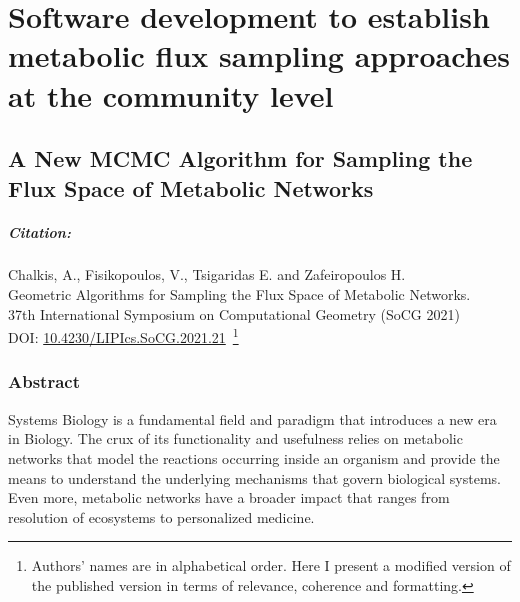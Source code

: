 % 
% 



\newtheorem{thm}{Theorem}
\newtheorem{lem}[thm]{Lemma}
\newtheorem{remark}[thm]{Remark}


\chapter{Software development to establish metabolic flux sampling 
         approaches at the community level}
\label{cha:dingo}


\section{A New MCMC Algorithm for Sampling the Flux Space of
Metabolic Networks}

\paragraph{Citation:}
Chalkis, A., Fisikopoulos, V., Tsigaridas E. and Zafeiropoulos H.\\ 
Geometric Algorithms for Sampling the Flux Space of Metabolic Networks. \\ 
37th International Symposium on Computational Geometry (SoCG 2021) \\ 
DOI: \href{https://drops.dagstuhl.de/opus/volltexte/2021/13820/}{10.4230/LIPIcs.SoCG.2021.21}~\footnote{
   Authors' names are in alphabetical order. 
   Here I present a modified version of the published version 
   in terms of relevance, coherence and formatting.
}


\subsection{Abstract}
\label{sec:mmcs-abstract}

   Systems Biology is a fundamental field and paradigm that introduces a new era in Biology.
   The crux of its functionality and usefulness relies on metabolic networks
   that model the reactions occurring inside an organism
   and provide the means to understand the underlying mechanisms that govern biological systems.
   Even more, metabolic networks have a broader impact that ranges from
   resolution of ecosystems to personalized medicine.

